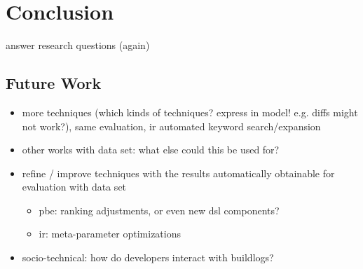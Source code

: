 \documentclass[\myrootdir/main.tex]{subfiles}
\begin{document}
\chapter{Conclusion}
\label{sec:conclusion}
answer research questions (again)

\section{Future Work}
\label{sec:fw}
\begin{itemize}
  \item more techniques (which kinds of techniques? express in model! e.g. diffs might not work?), same evaluation, ir automated keyword search/expansion
  \item other works with data set: what else could this be used for?
  \item refine / improve techniques with the results automatically obtainable for evaluation with data set
    \begin{itemize}
      \item pbe: ranking adjustments, or even new dsl components?
      \item ir: meta-parameter optimizations
    \end{itemize}
  \item socio-technical: how do developers interact with buildlogs?
\end{itemize}
\end{document}
